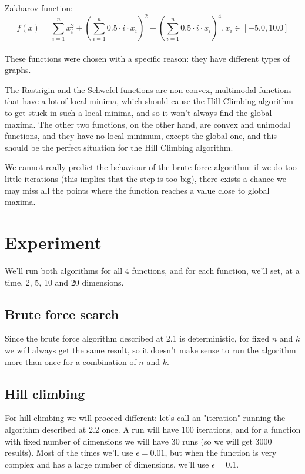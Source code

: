 \documentclass{article}
\begin{document}
Zakharov function:
$$ f(x) = \sum_{i=1}^{n} x_i^2 + (\sum_{i=1}^n 0.5 \cdot i \cdot x_i)^2 + (\sum_{i=1}^n 0.5 \cdot i \cdot x_i)^4, x_i \in \left[ -5.0, 10.0 \right]$$
\\


These functions were chosen with a specific reason: they have different types of graphs.

The Rastrigin and the Schwefel functions are non-convex, multimodal functions that have a lot of local minima, which should cause the Hill Climbing algorithm to get stuck in such a local minima, and so it won't always find the global maxima. 
The other two functions, on the other hand, are convex and unimodal functions, and they have no local minimum, except the global one, and this should be the perfect situation for the Hill Climbing algorithm.

We cannot really predict the behaviour of the brute force algorithm: if we do too little iterations (this implies that the step is too big), there exists a chance we may miss all the points where the function reaches a value close to global maxima.

\section{Experiment}

We'll run both algorithms for all 4 functions, and for each function, we'll set, at a time, 2, 5, 10 and 20 dimensions.

\subsection{Brute force search}

Since the brute force algorithm described at 2.1 is deterministic, for fixed $n$ and $k$ we will always get the same result, so it doesn't make sense to run the algorithm more than once for a combination of $n$ and $k$.

\subsection{Hill climbing}

For hill climbing we will proceed different: let's call an "iteration" running the algorithm described at 2.2 once. A run will have 100 iterations, and for a function with fixed number of dimensions we will have 30 runs (so we will get 3000 results). 
Most of the times we'll use $\epsilon = 0.01$, but when the function is very complex and has a large number of dimensions, we'll use $\epsilon = 0.1$.
\end{document}
